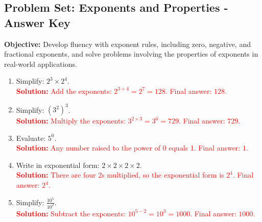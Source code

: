 \documentclass[9pt]{article}
\title{}
\date{}
\begin{document}
\subsection*{Problem Set: Exponents and Properties - Answer Key}
\onehalfspacing

\begin{tcolorbox}[colframe=black!40, colback=gray!5, 
coltitle=black, colbacktitle=black!20, fonttitle=\bfseries\Large, 
title=Learning Objective, halign title=center, left=5pt, right=5pt, top=5pt, bottom=15pt]
\textbf{Objective:} Develop fluency with exponent rules, including zero, negative, and fractional exponents, and solve problems involving the properties of exponents in real-world applications.
\end{tcolorbox}

\begin{tcolorbox}[colframe=black!60, colback=white, 
coltitle=black, colbacktitle=black!15, fonttitle=\bfseries\Large, 
title=Exercises (Part 1), halign title=center, left=10pt, right=10pt, top=10pt, bottom=40pt]
\begin{enumerate}[itemsep=2.5em]
    \item Simplify: \( 2^3 \times 2^4 \).\\
    \textcolor{red}{\textbf{Solution:} Add the exponents: \(2^{3+4} = 2^7 = 128\). Final answer: \(128\).}

    \item Simplify: \( (3^2)^3 \).\\
    \textcolor{red}{\textbf{Solution:} Multiply the exponents: \(3^{2 \times 3} = 3^6 = 729\). Final answer: \(729\).}

    \item Evaluate: \( 5^0 \).\\
    \textcolor{red}{\textbf{Solution:} Any number raised to the power of 0 equals 1. Final answer: \(1\).}

    \item Write in exponential form: \( 2 \times 2 \times 2 \times 2 \).\\
    \textcolor{red}{\textbf{Solution:} There are four 2s multiplied, so the exponential form is \(2^4\). Final answer: \(2^4\).}

    \item Simplify: \( \frac{10^5}{10^2} \).\\
    \textcolor{red}{\textbf{Solution:} Subtract the exponents: \(10^{5-2} = 10^3 = 1000\). Final answer: \(1000\).}
\end{enumerate}
\end{tcolorbox}
\end{document}
